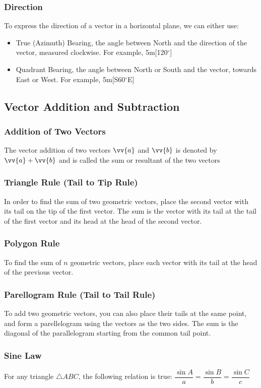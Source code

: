 \documentclass{article}
\begin{document}
	\subsubsection{Direction}
	To express the direction of a vector in a horizontal plane, we can either use:
	\begin{itemize}
		\item True (Azimuth) Bearing, the angle between North and the direction of the vector, measured clockwise. For example, 5m[120$^\circ$]
		\item Quadrant Bearing, the angle between North or South and the vector, towards East or West. For example, 5m[S60$^\circ$E]
	\end{itemize}
	\subsection{Vector Addition and Subtraction}
	\subsubsection{Addition of Two Vectors}
	The vector addition of two vectors $\vv{a}$ and $\vv{b}$ is denoted by $\vv{a}+\vv{b}$ and is called the sum or resultant of the two vectors
	\subsubsection{Triangle Rule (Tail to Tip Rule)}
	In order to find the sum of two geometric vectors, place the second vector with its tail on the tip of the first vector. The sum is the vector with its tail at the tail of the first vector and its head at the head of the second vector.
	\subsubsection{Polygon Rule}
	To find the sum of $n$ geometric vectors, place each vector with its tail at the head of the previous vector.
	\subsubsection{Parellogram Rule (Tail to Tail Rule)}
	To add two geometric vectors, you can also place their tails at the same point, and form a parellelogram using the vectors as the two sides. The sum is the diagonal of the parallelogram starting from the common tail point.
	\subsubsection{Sine Law}
	For any triangle $\triangle ABC$, the following relation is true: $\dfrac{\sin A}{a}=\dfrac{\sin B}{b}=\dfrac{\sin C}{c}$
\end{document}
